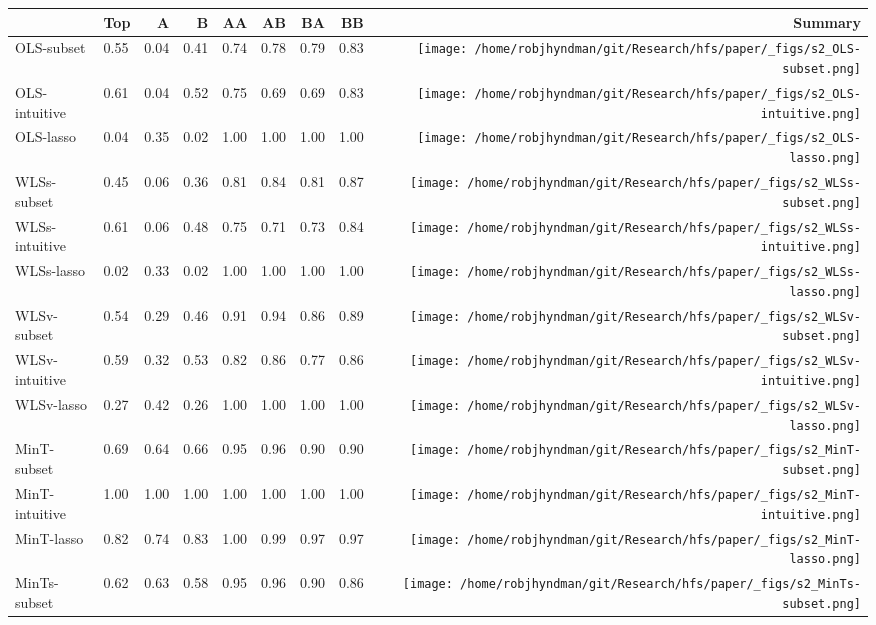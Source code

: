 \documentclass[
  12pt,
  11pt]{article}
\begin{document}
\begin{table}[!h]
\begin{threeparttable}
\begin{tabular}{llrrrrrr>{}r}
\toprule
  & Top & A & B & AA & AB & BA & BB & Summary\\
\midrule
OLS-subset & 0.55 & 0.04 & 0.41 & 0.74 & 0.78 & 0.79 & 0.83 & \texttt{[image: /home/robjhyndman/git/Research/hfs/paper/\_figs/s2\_OLS-subset.png]}\\
OLS-intuitive & 0.61 & 0.04 & 0.52 & 0.75 & 0.69 & 0.69 & 0.83 & \texttt{[image: /home/robjhyndman/git/Research/hfs/paper/\_figs/s2\_OLS-intuitive.png]}\\
OLS-lasso & 0.04 & 0.35 & 0.02 & 1.00 & 1.00 & 1.00 & 1.00 & \texttt{[image: /home/robjhyndman/git/Research/hfs/paper/\_figs/s2\_OLS-lasso.png]}\\
\midrule
WLSs-subset & 0.45 & 0.06 & 0.36 & 0.81 & 0.84 & 0.81 & 0.87 & \texttt{[image: /home/robjhyndman/git/Research/hfs/paper/\_figs/s2\_WLSs-subset.png]}\\
WLSs-intuitive & 0.61 & 0.06 & 0.48 & 0.75 & 0.71 & 0.73 & 0.84 & \texttt{[image: /home/robjhyndman/git/Research/hfs/paper/\_figs/s2\_WLSs-intuitive.png]}\\
WLSs-lasso & 0.02 & 0.33 & 0.02 & 1.00 & 1.00 & 1.00 & 1.00 & \texttt{[image: /home/robjhyndman/git/Research/hfs/paper/\_figs/s2\_WLSs-lasso.png]}\\
\midrule
WLSv-subset & 0.54 & 0.29 & 0.46 & 0.91 & 0.94 & 0.86 & 0.89 & \texttt{[image: /home/robjhyndman/git/Research/hfs/paper/\_figs/s2\_WLSv-subset.png]}\\
WLSv-intuitive & 0.59 & 0.32 & 0.53 & 0.82 & 0.86 & 0.77 & 0.86 & \texttt{[image: /home/robjhyndman/git/Research/hfs/paper/\_figs/s2\_WLSv-intuitive.png]}\\
WLSv-lasso & 0.27 & 0.42 & 0.26 & 1.00 & 1.00 & 1.00 & 1.00 & \texttt{[image: /home/robjhyndman/git/Research/hfs/paper/\_figs/s2\_WLSv-lasso.png]}\\
\midrule
MinT-subset & 0.69 & 0.64 & 0.66 & 0.95 & 0.96 & 0.90 & 0.90 & \texttt{[image: /home/robjhyndman/git/Research/hfs/paper/\_figs/s2\_MinT-subset.png]}\\
MinT-intuitive & 1.00 & 1.00 & 1.00 & 1.00 & 1.00 & 1.00 & 1.00 & \texttt{[image: /home/robjhyndman/git/Research/hfs/paper/\_figs/s2\_MinT-intuitive.png]}\\
MinT-lasso & 0.82 & 0.74 & 0.83 & 1.00 & 0.99 & 0.97 & 0.97 & \texttt{[image: /home/robjhyndman/git/Research/hfs/paper/\_figs/s2\_MinT-lasso.png]}\\
\midrule
MinTs-subset & 0.62 & 0.63 & 0.58 & 0.95 & 0.96 & 0.90 & 0.86 & \texttt{[image: /home/robjhyndman/git/Research/hfs/paper/\_figs/s2\_MinTs-subset.png]}\\

\end{tabular}
\end{threeparttable}
\end{table}
\end{document}
